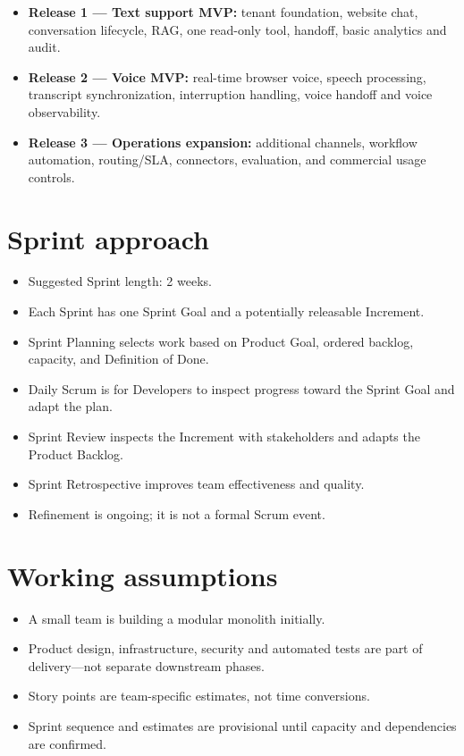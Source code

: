 \begin{itemize}
\item \textbf{Release 1 --- Text support MVP:} tenant foundation, website chat, conversation lifecycle, RAG, one read-only tool, handoff, basic analytics and audit.
\item \textbf{Release 2 --- Voice MVP:} real-time browser voice, speech processing, transcript synchronization, interruption handling, voice handoff and voice observability.
\item \textbf{Release 3 --- Operations expansion:} additional channels, workflow automation, routing/SLA, connectors, evaluation, and commercial usage controls.
\end{itemize}
\section{Sprint approach}

\begin{itemize}
\item Suggested Sprint length: 2 weeks.
\item Each Sprint has one Sprint Goal and a potentially releasable Increment.
\item Sprint Planning selects work based on Product Goal, ordered backlog, capacity, and Definition of Done.
\item Daily Scrum is for Developers to inspect progress toward the Sprint Goal and adapt the plan.
\item Sprint Review inspects the Increment with stakeholders and adapts the Product Backlog.
\item Sprint Retrospective improves team effectiveness and quality.
\item Refinement is ongoing; it is not a formal Scrum event.
\end{itemize}




\section{Working assumptions}

\begin{itemize}
\item A small team is building a modular monolith initially.
\item Product design, infrastructure, security and automated tests are part of delivery---not separate downstream phases.
\item Story points are team-specific estimates, not time conversions.
\item Sprint sequence and estimates are provisional until capacity and dependencies are confirmed.
\end{itemize}

